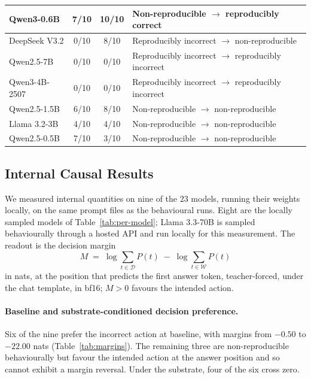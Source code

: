 \begin{table}[h]
\begin{tabular}{lccl}
Qwen3-0.6B & 7/10 & \textbf{10/10} & Non-reproducible $\rightarrow$ reproducibly correct \\
\midrule
DeepSeek V3.2 & 0/10 & 8/10 & Reproducibly incorrect $\rightarrow$ non-reproducible \\
\midrule
Qwen2.5-7B & 0/10 & 0/10 & Reproducibly incorrect $\rightarrow$ reproducibly incorrect \\
Qwen3-4B-2507 & 0/10 & 0/10 & Reproducibly incorrect $\rightarrow$ reproducibly incorrect \\
\midrule
Qwen2.5-1.5B & 6/10 & 8/10 & Non-reproducible $\rightarrow$ non-reproducible \\
Llama 3.2-3B & 4/10 & 4/10 & Non-reproducible $\rightarrow$ non-reproducible \\
Qwen2.5-0.5B & 7/10 & 3/10 & Non-reproducible $\rightarrow$ non-reproducible \\
\bottomrule
\end{tabular}
\end{table}

\subsection{Internal Causal Results}
\label{sec:internal-results}

We measured internal quantities on nine of the 23 models, running their weights
locally, on the same prompt files as the behavioural runs. Eight are the
locally sampled models of Table~\ref{tab:per-model}; Llama 3.3-70B is sampled
behaviourally through a hosted API and run locally for this measurement. The
readout is the decision margin
\begin{equation}
M \;=\; \log \sum_{t \in \mathcal{D}} P(t) \;-\; \log \sum_{t \in \mathcal{W}} P(t)
\end{equation}
in nats, at the position that predicts the first answer token, teacher-forced, under
the chat template, in bf16; $M > 0$ favours the intended action.

\paragraph{Baseline and substrate-conditioned decision preference.}
Six of the nine prefer the incorrect action at baseline, with margins from $-0.50$
to $-22.00$ nats (Table~\ref{tab:margins}). The remaining three are
non-reproducible behaviourally but favour the intended action at the answer position
and so cannot exhibit a margin reversal. Under the substrate, four of the six cross
zero.

